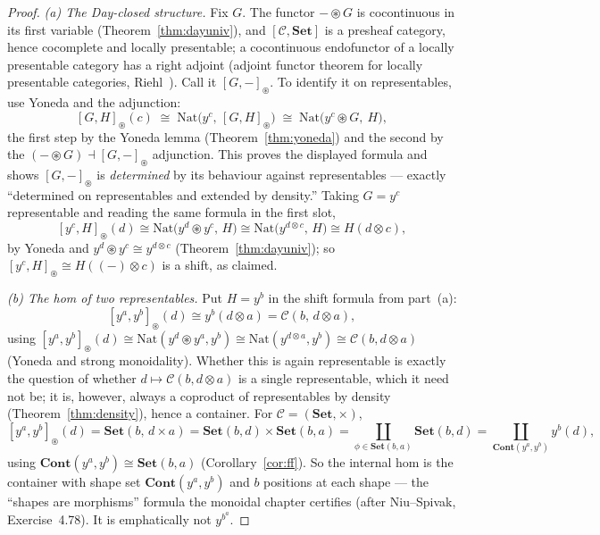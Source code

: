 \documentclass[11pt]{article}
\theoremstyle{plain}
\theoremstyle{definition}
\newcommand{\Set}{\mathbf{Set}}
\newcommand{\Cont}{\mathbf{Cont}}
\newcommand{\Nat}{\mathrm{Nat}}
\newcommand{\Day}{\circledast}
\newcommand{\iso}{\cong}
\begin{document}
\begin{proof}
\emph{(a) The Day-closed structure.} Fix $G$. The functor $-\Day G$ is
cocontinuous in its first variable (Theorem~\ref{thm:dayuniv}), and
$[\mathcal{C},\Set]$ is a presheaf category, hence cocomplete and locally
presentable; a cocontinuous endofunctor of a locally presentable category has a
right adjoint (adjoint functor theorem for locally presentable categories,
Riehl~\cite[\S E]{Riehl}). Call it $[G,-]_{\Day}$. To identify it on
representables, use Yoneda and the adjunction:
\[
  [G,H]_{\Day}(c)
  \;\iso\;\Nat\!\bigl(y^{c},\,[G,H]_{\Day}\bigr)
  \;\iso\;\Nat\!\bigl(y^{c}\Day G,\ H\bigr),
\]
the first step by the Yoneda lemma (Theorem~\ref{thm:yoneda}) and the second by
the $(-\Day G)\dashv[G,-]_{\Day}$ adjunction. This proves the displayed formula
and shows $[G,-]_{\Day}$ is \emph{determined} by its behaviour against
representables --- exactly ``determined on representables and extended by
density.'' Taking $G=y^{c}$ representable and reading the same formula in the
first slot,
\[
  [y^{c},H]_{\Day}(d)\iso\Nat\!\bigl(y^{d}\Day y^{c},\,H\bigr)
  \iso\Nat\!\bigl(y^{d\otimes c},\,H\bigr)\iso H(d\otimes c),
\]
by Yoneda and $y^{d}\Day y^{c}\iso y^{d\otimes c}$
(Theorem~\ref{thm:dayuniv}); so $[y^{c},H]_{\Day}\iso H((-)\otimes c)$ is a shift,
as claimed.

\emph{(b) The hom of two representables.} Put $H=y^{b}$ in the shift formula from
part~(a):
\[
  [y^{a},y^{b}]_{\Day}(d)\iso y^{b}(d\otimes a)
  =\mathcal C(b,\,d\otimes a),
\]
using $[y^{a},y^{b}]_{\Day}(d)\iso\Nat(y^{d}\Day y^{a},y^{b})\iso\Nat(y^{d\otimes
a},y^{b})\iso\mathcal C(b,d\otimes a)$ (Yoneda and strong monoidality). Whether
this is again representable is exactly the question of whether $d\mapsto\mathcal
C(b,d\otimes a)$ is a single representable, which it need not be; it is, however,
always a coproduct of representables by density (Theorem~\ref{thm:density}), hence
a container. For $\mathcal C=(\Set,\times)$,
\[
  [y^{a},y^{b}]_{\Day}(d)=\Set(b,\,d\times a)
  =\Set(b,d)\times\Set(b,a)
  =\coprod_{\phi\in\Set(b,a)}\Set(b,d)
  =\coprod_{\Cont(y^{a},y^{b})} y^{b}(d),
\]
using $\Cont(y^{a},y^{b})\iso\Set(b,a)$ (Corollary~\ref{cor:ff}). So the internal
hom is the container with shape set $\Cont(y^{a},y^{b})$ and $b$ positions at each
shape --- the ``shapes are morphisms'' formula the monoidal chapter certifies
(after Niu--Spivak, Exercise~4.78). It is emphatically not $y^{b^{a}}$.
\end{proof}
\end{document}
